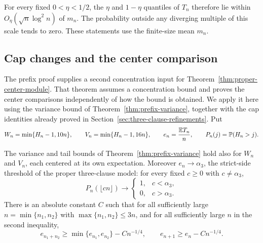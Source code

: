 For every fixed \(0<\eta<1/2\), the \(\eta\) and \(1-\eta\)
quantiles of \(T_n\) therefore lie within
\(O_\eta(\sqrt n\log^2 n)\) of \(m_n\).  The probability outside
any diverging multiple of this scale tends to zero.  These statements
use the finite-size mean \(m_n\).

\subsection{Cap changes and the center comparison}

The prefix proof supplies a second concentration input for
Theorem~\ref{thm:proper-center-module}.  That theorem assumes a
concentration bound and proves the center comparisons independently of
how the bound is obtained.  We apply it here using the variance bound of
Theorem~\ref{thm:prefix-variance}, together with the cap identities
already proved in Section~\ref{sec:three-clause-refinements}.  Put
\[
 W_n=\min\{H_n-1,10n\},\qquad V_n=\min\{H_n-1,16n\},
 \qquad e_n=\frac{\mathbb E T_n}{n},\qquad P_n(j)=\mathbb P(H_n>j).
\]

\begin{corollary}\label{cor:prefix-consequences}
The variance and tail bounds of Theorem~\ref{thm:prefix-variance} hold
also for \(W_n\) and \(V_n\), each centered at its own expectation.
Moreover \(e_n\to\alpha_3\), the strict-side threshold of the proper
three-clause model: for every fixed \(c\ge0\) with \(c\ne\alpha_3\),
\[
 P_n(\lfloor cn\rfloor)\longrightarrow
 \begin{cases}1,&c<\alpha_3,\\0,&c>\alpha_3.\end{cases}
\]
There is an absolute constant \(C\) such that for all sufficiently large
\(n=\min\{n_1,n_2\}\) with \(\max\{n_1,n_2\}\le3n\), and for all
sufficiently large \(n\) in the second inequality,
\begin{equation}\label{eq:prefix-center-comparisons}
 e_{n_1+n_2}\ge\min\{e_{n_1},e_{n_2}\}-Cn^{-1/4},
 \qquad e_{n+1}\ge e_n-Cn^{-1/4}.
\end{equation}
\end{corollary}

